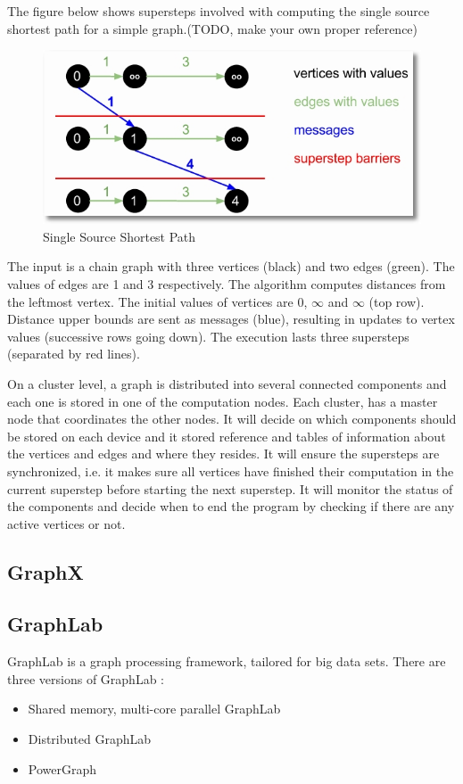 \documentclass[english]{tktltiki}
\begin{document}
The figure below shows supersteps involved with computing the single source shortest path for a simple graph.(TODO, make your own proper reference)
\begin{figure}[ht!]
\centering
\includegraphics[width=130mm]{figures/giraphsuperstep.jpg}
\caption{Single Source Shortest Path}
\end{figure}

The input is a chain graph with three vertices (black) and two edges (green). The values of edges are 1 and 3 respectively. The algorithm computes distances from the leftmost vertex. The initial values of vertices are 0, $\infty$ and $\infty$ (top row). Distance upper bounds are sent as messages (blue), resulting in updates to vertex values (successive rows going down). The execution lasts three supersteps (separated by red lines).

On a cluster level, a graph is distributed into several connected components and each one is stored in one of the computation nodes. Each cluster, has a master node that coordinates the other nodes. It will decide on which components should be stored on each device and it stored reference and tables of information about the vertices and edges and where they resides. It will ensure the supersteps are synchronized, i.e. it makes sure all vertices have finished their computation in the current superstep before starting the next superstep. It will monitor the status of the components and decide when to end the program by checking if there are any active vertices or not. 
\subsection{GraphX}

\subsection{GraphLab}
GraphLab is a graph processing framework, tailored for big data sets. There are three versions of GraphLab :
\begin{itemize}
\item
Shared memory, multi-core parallel GraphLab
\item
Distributed GraphLab
\item
PowerGraph

\end{itemize} 
\end{document}

